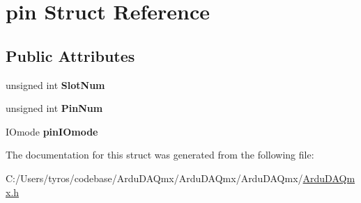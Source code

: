 \hypertarget{structpin}{}\section{pin Struct Reference}
\label{structpin}
\subsection*{Public Attributes}
\begin{DoxyCompactItemize}
\item 
\mbox{\label{structpin_a1baf28f2a942dc95e094b28ca2b53de6}} 
unsigned int {\bfseries Slot\+Num}
\item 
\mbox{\label{structpin_af1958e62ebeecdc276d42c16c549339d}} 
unsigned int {\bfseries Pin\+Num}
\item 
\mbox{\label{structpin_a53dd567dff9e41903c0ae15cead3ab1d}} 
I\+Omode {\bfseries pin\+I\+Omode}
\end{DoxyCompactItemize}


The documentation for this struct was generated from the following file\+:\begin{DoxyCompactItemize}
\item 
C\+:/\+Users/tyros/codebase/\+Ardu\+D\+A\+Qmx/\+Ardu\+D\+A\+Qmx/\+Ardu\+D\+A\+Qmx/\mbox{\hyperlink{_ardu_d_a_qmx_8h}{Ardu\+D\+A\+Qmx.\+h}}\end{DoxyCompactItemize}
